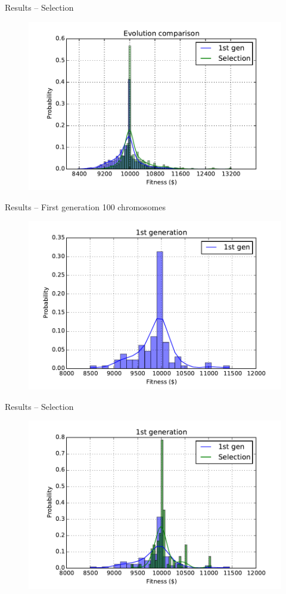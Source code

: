 \documentclass[12pt,portuguese]{beamer}
\begin{document}
\begin{frame}{Results -- Selection}
	\begin{figure}[h]
	\centering
	\includegraphics[width=0.9\columnwidth]{images/01r_1000_sel.pdf}
	\end{figure}
\end{frame}

\begin{frame}{Results -- First generation 100 chromosomes}
	\begin{figure}[h]
	\centering
	\includegraphics[width=0.9\columnwidth]{images/01r_100.pdf}
	\end{figure}
\end{frame}

\begin{frame}{Results -- Selection}
	\begin{figure}[h]
	\centering
	\includegraphics[width=0.9\columnwidth]{images/01r_100_sel1.pdf}
	\end{figure}
\end{frame}
\end{document}
